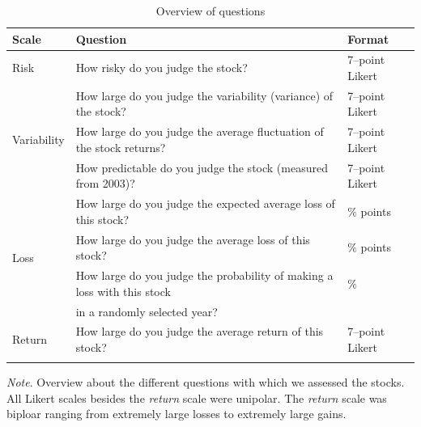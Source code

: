 \documentclass[a4paper,man, natbib,floatsintext]{apa6} %
\begin{document}








\begin{table}
\centering
\begin{threeparttable}
\caption{Overview of questions}
\small
\label{table:Questions}
\begin{tabular} {lll}
Scale & Question & Format \\

\toprule
\multirow{1}{*}{Risk} & How risky do you judge the stock? & 7--point Likert\\ %
\midrule
\multirow{3}{*}{Variability} & How large do you judge the variability (variance) of the stock? & 7--point Likert\\
&  How large do you judge the average fluctuation of the stock returns? & 7--point Likert\\ 
 & How predictable do you judge the  stock (measured from 2003)? & 7--point Likert\\
\midrule
\multirow{4}{*}{Loss} & How large do you judge the expected average loss of this stock? &  $\%$ points \\
     & How large do you judge the average loss of this stock? & $\%$ points\\
     & How large do you judge the probability of making a loss with this stock & $\%$\\
     &  in a randomly selected year? & \\
\midrule

\multirow{1}{*}{Return} & How large do you judge the average return of this stock? & 7--point Likert \\
\bottomrule
\\
\end{tabular}
\begin{tablenotes}
\small
\item
 \textit{Note}. Overview about the different questions with which we assessed the stocks. All Likert scales besides the \textit{return} scale were unipolar. The \textit{return} scale was biploar ranging from extremely large losses to extremely large gains.

\end{tablenotes}
\end{threeparttable}
\end{table}
\end{document}
